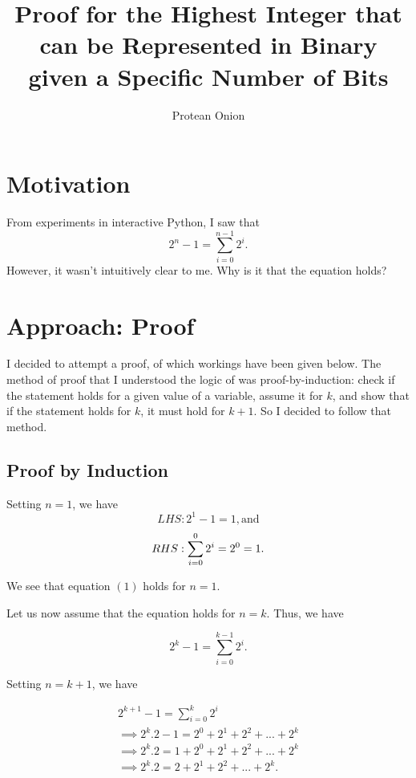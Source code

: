\documentclass[11pt]{article}
\title{\textbf{Proof for the Highest Integer that can be Represented in Binary given a Specific Number of Bits}}
\author{Protean Onion}
\date{}
\begin{document}
\maketitle

\section{Motivation}
From experiments in interactive Python, I saw that
    \begin{equation}
        2^{n} - 1 = \sum_{i = 0}^{n - 1}2^{i}.
    \end{equation}
However, it wasn't intuitively clear to me. Why is it that the equation holds?

\section{Approach: Proof}
I decided to attempt a proof, of which workings have been given below. The method of proof that I understood the logic of was proof-by-induction: check if the statement holds for a given value of a variable, assume it for $k$, and show that if the statement holds for $k$, it must hold for $k + 1$. So I decided to follow that method.
\subsection{Proof by Induction}
Setting $n = 1$, we have
    \begin{equation}
        LHS: 2^{1} - 1 = 1, \textrm{and}
    \end{equation}
    \begin{equation}
        RHS: \sum_{i = 0}^{0}2^{i} \\ = 2^{0} = 1.
    \end{equation}
    
We see that equation $(1)$ holds for $n = 1$.

    \begin{flushleft}
        Let us now assume that the equation holds for $n = k$. Thus, we have
    \end{flushleft}
    \begin{equation}
        2^{k} - 1 = \sum_{i = 0}^{k - 1} 2^{i}.
    \end{equation}
    
    \begin{flushleft}
        Setting $n = k + 1$, we have
    \end{flushleft}
    \begin{align*}
        2^{k + 1} - 1 = \sum_{i = 0}^{k} 2^{i} \\ \implies 2^{k}.2 - 1 = 2^{0} + 2^{1} + 2^{2} + ... + 2^{k} \\ \implies 2^{k}.2 = 1 + 2^{0} + 2^{1} + 2^{2} + ... + 2^{k} \\ \implies 2^{k}.2 = 2 + 2^{1} + 2^{2} + ... + 2^{k}.
    \end{align*}
    
\end{document}
